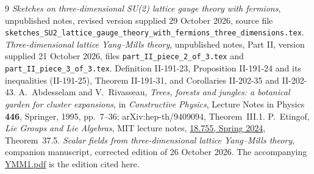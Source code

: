 \documentclass[11pt,letterpaper,reqno]{amsart}
\theoremstyle{definition}
\theoremstyle{remark}
\begin{document}
\begin{thebibliography}{9}
\emph{Sketches on three-dimensional SU(2) lattice gauge theory with fermions},
unpublished notes, revised version supplied 29 October 2026, source file
\nolinkurl{sketches_SU2_lattice_gauge_theory_with_fermions_three_dimensions.tex}.
\emph{Three-dimensional lattice Yang--Mills theory},
unpublished notes, Part II, version supplied 21 October 2026,
files \nolinkurl{part_II_piece_2_of_3.tex} and
\nolinkurl{part_II_piece_3_of_3.tex}.
Definition II-191-23, Proposition II-191-24 and its inequalities
(II-191-25), Theorem II-191-31, and Corollaries II-202-35
and II-202-43.
A.~Abdesselam and V.~Rivasseau,
\emph{Trees, forests and jungles: a botanical garden for cluster expansions},
in \emph{Constructive Physics}, Lecture Notes in Physics \textbf{446},
Springer, 1995, pp.~7--36; arXiv:hep-th/9409094, Theorem~III.1.
P.~Etingof, \emph{Lie Groups and Lie Algebras}, MIT lecture notes,
\href{https://ocw.mit.edu/courses/18-755-lie-groups-and-lie-algebras-ii-spring-2024/mit18_755_s24_lec_full.pdf}{18.755, Spring 2024}, Theorem~37.5.
\emph{Scalar fields from three-dimensional lattice Yang--Mills theory},
companion manuscript, corrected edition of 26 October 2026.
The accompanying \href{../YM3/Revisions/YMM1-2026-10-26.pdf}{YMM1.pdf} is the edition cited here.
\end{thebibliography}
\end{document}
